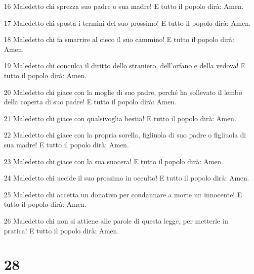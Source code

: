 \par 16 Maledetto chi sprezza suo padre o sua madre! E tutto il popolo dirà: Amen.
\par 17 Maledetto chi sposta i termini del suo prossimo! E tutto il popolo dirà: Amen.
\par 18 Maledetto chi fa smarrire al cieco il suo cammino! E tutto il popolo dirà: Amen.
\par 19 Maledetto chi conculca il diritto dello straniero, dell'orfano e della vedova! E tutto il popolo dirà: Amen.
\par 20 Maledetto chi giace con la moglie di suo padre, perché ha sollevato il lembo della coperta di suo padre! E tutto il popolo dirà: Amen.
\par 21 Maledetto chi giace con qualsivoglia bestia! E tutto il popolo dirà: Amen.
\par 22 Maledetto chi giace con la propria sorella, figliuola di suo padre o figliuola di sua madre! E tutto il popolo dirà: Amen.
\par 23 Maledetto chi giace con la sua suocera! E tutto il popolo dirà: Amen.
\par 24 Maledetto chi uccide il suo prossimo in occulto! E tutto il popolo dirà: Amen.
\par 25 Maledetto chi accetta un donativo per condannare a morte un innocente! E tutto il popolo dirà: Amen.
\par 26 Maledetto chi non si attiene alle parole di questa legge, per metterle in pratica! E tutto il popolo dirà: Amen.

\chapter{28}

